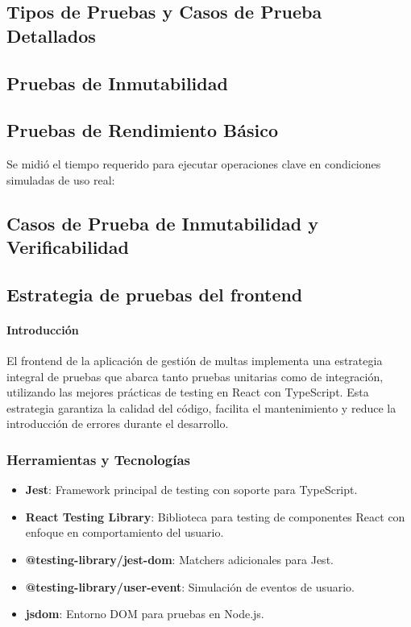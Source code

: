 \subsection{Tipos de Pruebas y Casos de Prueba Detallados}



\subsection{Pruebas de Inmutabilidad}



\subsection{Pruebas de Rendimiento Básico}

Se midió el tiempo requerido para ejecutar operaciones clave en condiciones simuladas de uso real:



\subsection{Casos de Prueba de Inmutabilidad y Verificabilidad}



\subsection{Estrategia de pruebas del frontend}

\paragraph{Introducción}
El frontend de la aplicación de gestión de multas implementa una estrategia integral de pruebas que abarca tanto pruebas unitarias como de integración, utilizando las mejores prácticas de testing en React con TypeScript. Esta estrategia garantiza la calidad del código, facilita el mantenimiento y reduce la introducción de errores durante el desarrollo.

\subsubsection{Herramientas y Tecnologías}
\begin{itemize}
    \item \textbf{Jest}: Framework principal de testing con soporte para TypeScript.
    \item \textbf{React Testing Library}: Biblioteca para testing de componentes React con enfoque en comportamiento del usuario.
    \item \textbf{@testing-library/jest-dom}: Matchers adicionales para Jest.
    \item \textbf{@testing-library/user-event}: Simulación de eventos de usuario.
    \item \textbf{jsdom}: Entorno DOM para pruebas en Node.js.
\end{itemize}

